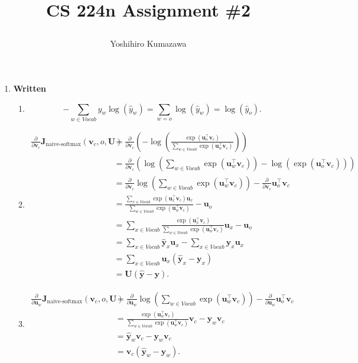 \documentclass[12pt, dvipdfmx]{article}
\title{
  \vspace{-2cm}
  CS 224n Assignment \#2 \\
  \author{Yoshihiro Kumazawa}
}
\begin{document}
\maketitle
\begin{enumerate}[label=\textbf{\arabic*}]
\item \textbf{Written}
\begin{enumerate}[label=(\alph*)]
\item \[-\sum_{w\in Vocab}y_w\log(\hat{y}_w)=\sum_{w=o}\log(\hat{y}_w)=\log(\hat{y}_o).\]
\item \begin{align*}
\frac{\partial}{\partial\bm{v}_c}\bm{J}_{\textrm{naive-softmax}}(\bm{v}_c,o,\bm{U}) &=\frac{\partial}{\partial\bm{v}_c}\left(-\log\left(\frac{\exp(\bm{u}_o^\top\bm{v}_c)}{\sum_{w\in Vocab}\exp(\bm{u}_w^\top\bm{v}_c)}\right)\right) \\
&=\frac{\partial}{\partial\bm{v}_c}\left(\log\left(\sum_{w\in Vocab}\exp(\bm{u}_w^\top\bm{v}_c)\right)-\log\left(\exp(\bm{u}_o^\top\bm{v}_c)\right)\right) \\
&=\frac{\partial}{\partial\bm{v}_c}\log\left(\sum_{w\in Vocab}\exp(\bm{u}_w^\top\bm{v}_c)\right)-\frac{\partial}{\partial\bm{v}_c}\bm{u}_o^\top\bm{v}_c \\
&=\frac{\sum_{x\in Vocab}\exp(\bm{u}_x^\top\bm{v}_c)\bm{u}_x}{\sum_{w\in Vocab}\exp(\bm{u}_w^\top\bm{v}_c)}-\bm{u}_o \\
&=\sum_{x\in Vocab}\frac{\exp(\bm{u}_x^\top\bm{v}_c)}{\sum_{w\in Vocab}\exp(\bm{u}_w^\top\bm{v}_c)}\bm{u}_x-\bm{u}_o \\
&=\sum_{x\in Vocab}\bm{\hat{y}}_x\bm{u}_x-\sum_{x\in Vocab}\bm{y}_x\bm{u}_x \\
&=\sum_{x\in Vocab}\bm{u}_x(\bm{\hat{y}}_x-\bm{y}_x) \\
&=\bm{U}(\bm{\hat{y}}-\bm{y}).
\end{align*}
\item \begin{align*} \frac{\partial}{\partial\bm{u}_w}\bm{J}_{\textrm{naive-softmax}}(\bm{v}_c,o,\bm{U}) &=\frac{\partial}{\partial\bm{u}_w}\log\left(\sum_{w\in Vocab}\exp(\bm{u}_w^\top\bm{v}_c)\right)-\frac{\partial}{\partial\bm{u}_w}\bm{u}_o^\top\bm{v}_c \\
&=\frac{\exp(\bm{u}_w^\top\bm{v}_c)}{\sum_{w\in Vocab}\exp(\bm{u}_w^\top\bm{v}_c)}\bm{v}_c-\bm{y}_w\bm{v}_c \\
&=\bm{\hat{y}}_w\bm{v}_c-\bm{y}_w\bm{v}_c \\
&=\bm{v}_c(\bm{\hat{y}}_w-\bm{y}_w).
\end{align*}

\end{enumerate}
\end{enumerate}
\end{document}
